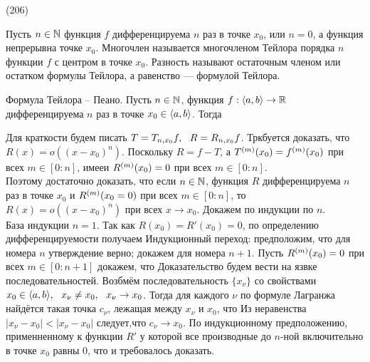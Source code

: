 (206)

\Op Пусть $n \in \mathbb{N}$ функция $f$ дифференцируема $n$ раз в точке $x_0$, или $n = 0$, а функция непрерывна точке $x_0$. Многочлен  называется многочленом Тейлора порядка $n$ функции $f$ с центром в точке $x_0$. Разность  называют остаточным членом или остатком формулы Тейлора, а равенство  --- формулой Тейлора.


\T \q Формула Тейлора -- Пеано. Пусть $n \in \mathbb{N}$, функция $f: \langle a, b \rangle \to \mathbb{R}$ дифференцируема $n$ раз в точке $x_0 \in \langle a, b \rangle$. Тогда 

\D Для краткости будем писать $T = T_{n, x_0} f,\ \  R = R_{n, x_0}f$. Тркбуется доказать, что $R(x) = o((x - x_0)^n)$. Поскольку $R = f - T$, а $T^{(m)} (x_0) = f^{(m)}(x_0)$ при всех $m \in [0: n]$, имееи $R^{(m)}(x_0) = 0$ при всех $m \in [0: n]$.\\
Поэтому достаточно доказать, что если $n \in \mathbb{N}$, функция $R$ дифференцируема $n$ раз в точке $x_0$ и $R^{(m)} (x_0 = 0)$ при всех $m \in [0: n]$, то $R(x) = o((x - x_0)^n)$ при всех $x \to x_0$. Докажем по индукции по $n$.\\
База индукции $n = 1$. Так как $R(x_0) = R'(x_0) = 0$, по определению дифференцируемости получаем 
Индукционный переход: предположим, что для номера $n$ утверждение верно; докажем для номера $n + 1$. Пусть $R^{(m)}(x_0) = 0$ при всех $m \in [0: n + 1]$ докажем, что  Доказательство будем вести на язвке последовательностей. Возбмём последовательность $\{x_\nu\}$ со свойствами $x_0 \in \langle a, b \rangle,\ \  x_\nu \neq x_0,\ \  x_\nu \to x_0$. Тогда для каждого $\nu$ по формуле Лагранжа найдётся такая точка $c_\nu$, лежащая между $x_\nu$ и $x_0$, что  Из неравенства $|x_\nu - x_0| < |x_\nu - x_0|$ следует,что $c_\nu \to x_0$. По индукционному предположению, применненному к функции $R'$ у которой все производные до $n$-ной включительно в точке $x_0$ равны 0,  что и требовалось доказать.
